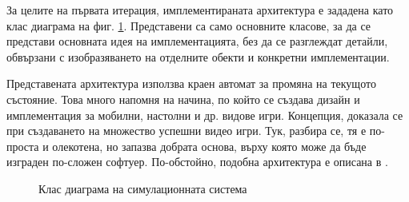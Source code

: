 		За целите на първата итерация, имплементираната архитектура е зададена като клас диаграма на фиг. \ref{figure:simulation-class-diagram}.
		Представени са само основните класове, за да се представи основната идея на имплементацията, без
		да се разглеждат детайли, обвързани с изобразяването на отделните обекти и конкретни имплементации.
		
		Представената архитектура използва краен автомат за промяна на текущото състояние.
		Това много напомня на начина, по който се създава дизайн и имплементация за мобилни, настолни
		и др. видове игри. Концепция, доказала се при създаването на множество успешни видео игри. 
		Тук, разбира се, тя е по-проста и олекотена, но запазва добрата основа, 
		върху която може да бъде изграден по-сложен софтуер. По-обстойно, подобна архитектура е описана в \cite{Rollings}.
		
		\begin{figure}
			\caption{Клас диаграма на симулационната система}
			\label{figure:simulation-class-diagram}
				\begin{center}
				\end{center}
		\end{figure}
		
